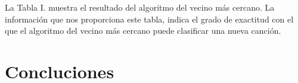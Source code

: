 \documentclass[conference]{IEEEtran}
\begin{document}
La Tabla I. muestra el resultado del algoritmo del vecino más cercano. La información que nos proporciona este tabla, indica el grado de exactitud con el que el algoritmo del vecino más cercano puede clasificar una nueva canción. \\

\section{Concluciones}

\begin{thebibliography}{1}
\item [1]
\end{thebibliography}
\end{document}
